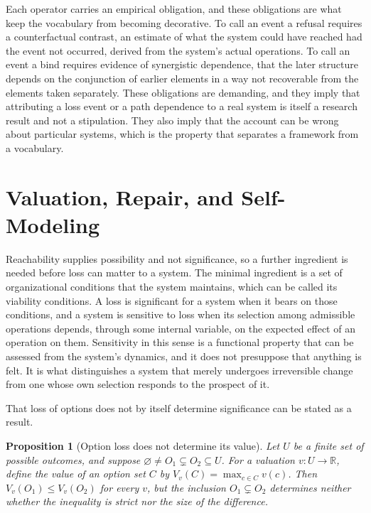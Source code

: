 \documentclass[11pt]{article}
\theoremstyle{definition}
\theoremstyle{plain}
\newtheorem{proposition}{Proposition}
\theoremstyle{remark}
\begin{document}
Each operator carries an empirical obligation, and these obligations are what keep the vocabulary from becoming decorative. To call an event a refusal requires a counterfactual contrast, an estimate of what the system could have reached had the event not occurred, derived from the system's actual operations. To call an event a bind requires evidence of synergistic dependence, that the later structure depends on the conjunction of earlier elements in a way not recoverable from the elements taken separately. These obligations are demanding, and they imply that attributing a loss event or a path dependence to a real system is itself a research result and not a stipulation. They also imply that the account can be wrong about particular systems, which is the property that separates a framework from a vocabulary.

\section{Valuation, Repair, and Self-Modeling}

Reachability supplies possibility and not significance, so a further ingredient is needed before loss can matter to a system. The minimal ingredient is a set of organizational conditions that the system maintains, which can be called its viability conditions. A loss is significant for a system when it bears on those conditions, and a system is sensitive to loss when its selection among admissible operations depends, through some internal variable, on the expected effect of an operation on them. Sensitivity in this sense is a functional property that can be assessed from the system's dynamics, and it does not presuppose that anything is felt. It is what distinguishes a system that merely undergoes irreversible change from one whose own selection responds to the prospect of it.

That loss of options does not by itself determine significance can be stated as a result.

\begin{proposition}[Option loss does not determine its value]
Let $U$ be a finite set of possible outcomes, and suppose $\varnothing \neq O_1 \subsetneq O_2 \subseteq U$. For a valuation $v : U \to \mathbb{R}$, define the value of an option set $C$ by $V_v(C) = \max_{c \in C} v(c)$. Then $V_v(O_1) \le V_v(O_2)$ for every $v$, but the inclusion $O_1 \subsetneq O_2$ determines neither whether the inequality is strict nor the size of the difference.
\end{proposition}
\end{document}
